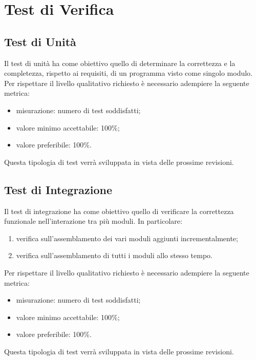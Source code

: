 \section{Test di Verifica}

\subsection{Test di Unità}
Il test di unità ha come obiettivo quello di determinare la correttezza e la completezza, rispetto ai requisiti, di un programma visto come singolo modulo.\\
Per rispettare il livello qualitativo richiesto è necessario adempiere la seguente metrica:
\begin{itemize}
	\item misurazione: numero di test soddisfatti;
	\item valore minimo accettabile: 100\%;
	\item valore preferibile: 100\%.
\end{itemize}
Questa tipologia di test verrà sviluppata in vista delle prossime revisioni.


\subsection{Test di Integrazione}
Il test di integrazione ha come obiettivo quello di verificare la correttezza funzionale nell’interazione tra più moduli. In particolare:
\begin{enumerate}
	\item verifica sull'assemblamento dei vari moduli aggiunti incrementalmente;
	\item verifica sull'assemblamento di tutti i moduli allo stesso tempo.
\end{enumerate}
Per rispettare il livello qualitativo richiesto è necessario adempiere la seguente metrica:
\begin{itemize}
\item misurazione: numero di test soddisfatti;
\item valore minimo accettabile: 100\%;
\item valore preferibile: 100\%.
\end{itemize}
Questa tipologia di test verrà sviluppata in vista delle prossime revisioni.


